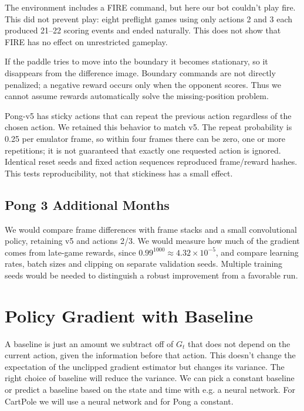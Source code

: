 \documentclass{article}
\begin{document}
The environment includes a FIRE command, but here our bot couldn't play fire. This did not prevent play: eight preflight games using only actions 2 and 3 each produced 21--22 scoring events and ended naturally. This does not show that FIRE has no effect on unrestricted gameplay.

If the paddle tries to move into the boundary it becomes stationary, so it disappears from the difference image. Boundary commands are not directly penalized; a negative reward occurs only when the opponent scores. Thus we cannot assume rewards automatically solve the missing-position problem.

Pong-v5 has sticky actions that can repeat the previous action regardless of the chosen action. We retained this behavior to match v5. The repeat probability is 0.25 per emulator frame, so within four frames there can be zero, one or more repetitions; it is not guaranteed that exactly one requested action is ignored. Identical reset seeds and fixed action sequences reproduced frame/reward hashes. This tests reproducibility, not that stickiness has a small effect.



\begin{samepage}
\subsection{Pong 3 Additional Months}
We would compare frame differences with frame stacks and a small convolutional policy, retaining v5 and actions 2/3. We would measure how much of the gradient comes from late-game rewards, since $0.99^{1000}\approx4.32\times10^{-5}$, and compare learning rates, batch sizes and clipping on separate validation seeds. Multiple training seeds would be needed to distinguish a robust improvement from a favorable run.

\par\end{samepage}

\section{Policy Gradient with Baseline}
A baseline is just an amount we subtract off of $G_t$ that does not depend on the current action, given the information before that action. This doesn't change the expectation of the unclipped gradient estimator but changes its variance. The right choice of baseline will reduce the variance. We can pick a constant baseline or predict a baseline based on the state and time with e.g. a neural network. For CartPole we will use a neural network and for Pong a constant.
\end{document}
